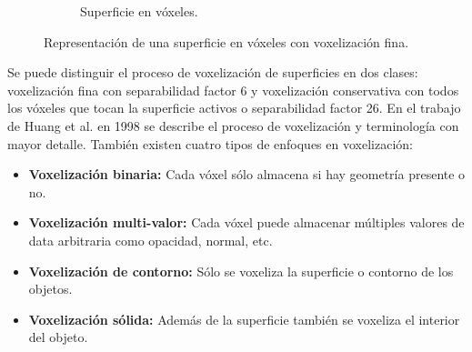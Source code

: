 \begin{figure}[H]
\begin{subfigure}{0.33\textwidth}
		\captionsetup{width=.95\textwidth}
		\caption{Superficie en vóxeles.}
	\end{subfigure}%
	\caption{Representación de una superficie en vóxeles con voxelización fina.}
	\label{fig:rigid_grid}
\end{figure}

Se puede distinguir el proceso de voxelización de superficies en dos clases: voxelización fina con separabilidad factor 6 y voxelización conservativa con todos los vóxeles que tocan la superficie activos o separabilidad factor 26. En el trabajo de Huang et al. en 1998 \cite{Huang:1998:AMV:288126.288181} se describe el proceso de voxelización y terminología con mayor detalle. También existen cuatro tipos de enfoques en voxelización:

\begin{itemize}
	\label{list:voxelization_types}
	\item \textbf{Voxelización binaria:} Cada vóxel sólo almacena si hay geometría presente o no.
	\item \textbf{Voxelización multi-valor:} Cada vóxel puede almacenar múltiples valores de data arbitraria como opacidad, normal, etc.
	\item \textbf{Voxelización de contorno:} Sólo se voxeliza la superficie o contorno de los objetos.
	\item \textbf{Voxelización sólida:} Además de la superficie también se voxeliza el interior del objeto.
\end{itemize}
